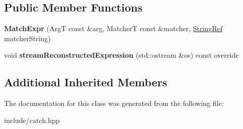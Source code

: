 \subsection*{Public Member Functions}
\begin{DoxyCompactItemize}
\item 
{\bfseries Match\+Expr} (ArgT const \&arg, MatcherT const \&matcher, \hyperlink{classCatch_1_1StringRef}{String\+Ref} matcher\+String)\hypertarget{classCatch_1_1MatchExpr_ab5b9ecc4fb9e91f5f48756e75affe93d}{}\label{classCatch_1_1MatchExpr_ab5b9ecc4fb9e91f5f48756e75affe93d}

\item 
void {\bfseries stream\+Reconstructed\+Expression} (std\+::ostream \&os) const override\hypertarget{classCatch_1_1MatchExpr_ad3e41adb597750b2219bb37e51185629}{}\label{classCatch_1_1MatchExpr_ad3e41adb597750b2219bb37e51185629}

\end{DoxyCompactItemize}
\subsection*{Additional Inherited Members}


The documentation for this class was generated from the following file\+:\begin{DoxyCompactItemize}
\item 
include/catch.\+hpp\end{DoxyCompactItemize}

